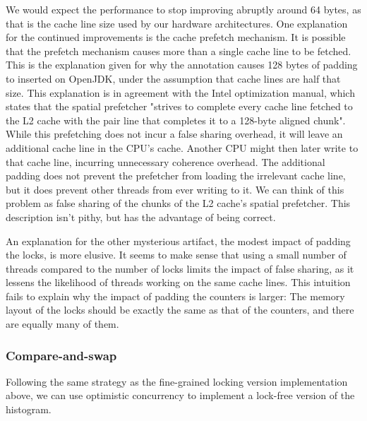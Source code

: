 We would expect the performance to stop improving abruptly around 64
bytes, as that is the cache line size used by our hardware architectures.
One explanation for the continued improvements is the cache prefetch mechanism.
It is possible that the prefetch mechanism causes more than a single cache line
to be fetched. This is the explanation given for why the 
annotation causes 128 bytes of padding to inserted on OpenJDK, under the
assumption that cache lines are half that size\cite{openjdkmailcontended}.
This explanation is in agreement with the Intel optimization
manual\cite{inteloptimize}, which states that the spatial prefetcher
"strives to complete every cache line fetched to the L2 cache with the pair line
that completes it to a 128-byte aligned chunk"\footnotemark. While this
prefetching does not incur a false sharing overhead, it will leave an additional
cache line in the CPU's cache. Another CPU might then later write to that
cache line, incurring unnecessary coherence overhead. The additional padding
does not prevent the prefetcher from loading the irrelevant cache line, but it
does prevent other threads from ever writing to it. We can think of this problem
as false sharing of the chunks of the L2 cache's spatial prefetcher. This
description isn't pithy, but has the advantage of being correct.

An explanation for the other mysterious artifact, the modest impact of padding
the locks, is more elusive. It seems to make sense that using a small number of
threads compared to the number of locks limits the impact of false sharing, as
it lessens the likelihood of threads working on the same cache lines. This
intuition fails to explain why the impact of padding the counters is larger: The
memory layout of the locks should be exactly the same as that of the counters,
and there are equally many of them.




\subsubsection{Compare-and-swap}
Following the same strategy as the fine-grained locking version implementation
above, we can use optimistic concurrency to implement a lock-free version of
the histogram.

